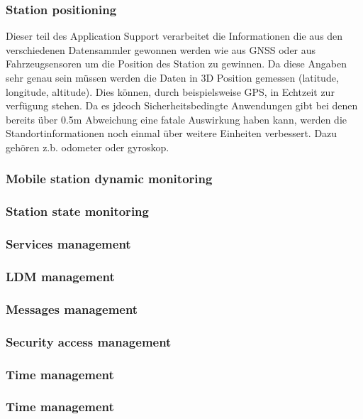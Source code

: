\subsubsection{Station positioning}
Dieser teil des Application Support verarbeitet die Informationen die aus den verschiedenen Datensammler gewonnen werden wie aus GNSS oder aus Fahrzeugsensoren um die Position des Station zu gewinnen. 
Da diese Angaben sehr genau sein müssen werden die Daten in 3D Position gemessen (latitude, longitude, altitude). Dies können, durch beispielsweise GPS, in Echtzeit zur verfügung stehen. Da es jdeoch Sicherheitsbedingte Anwendungen gibt bei denen bereits über 0.5m Abweichung eine fatale Auswirkung haben kann, werden die Standortinformationen noch einmal über weitere Einheiten verbessert. Dazu gehören z.b. odometer oder gyroskop.

\subsubsection{Mobile station dynamic monitoring}

\subsubsection{Station state monitoring}

\subsubsection{Services management }

\subsubsection{LDM management }

\subsubsection{Messages management}

\subsubsection{Security access management}
\subsubsection{Time management}
\subsubsection{Time management}
